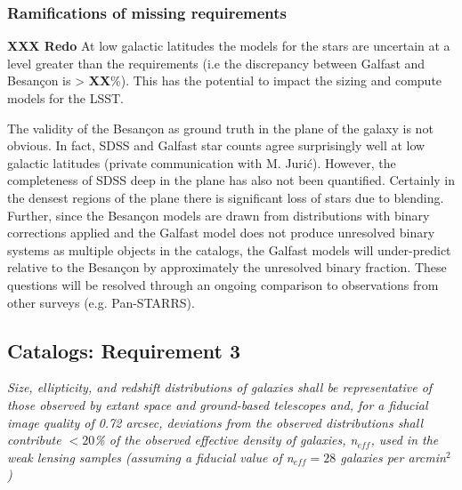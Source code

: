 \documentclass[]{article}
\begin{document}
\subsubsection{Ramifications of missing requirements}


{\bf XXX Redo}
At low galactic latitudes the models for the stars are uncertain at a
level greater than the requirements (i.e the discrepancy between
Galfast and Besan\c{c}on is > {\bf XX}\%).  This has the potential to
impact the sizing and compute models for the LSST.

The validity of the Besan\c{c}on as ground truth in the plane of the
galaxy is not obvious.  In fact, SDSS and Galfast star counts agree
surprisingly well at low galactic latitudes (private communication
with M. Juri\'{c}).  However, the completeness of SDSS deep in the
plane has also not been quantified.  Certainly in the densest regions
of the plane there is significant loss of stars due to blending.
Further, since the Besan\c{c}on models are drawn from distributions
with binary corrections applied and the Galfast model does not produce
unresolved binary systems as multiple objects in the catalogs, the
Galfast models will under-predict relative to the Besan\c{c}on by
approximately the unresolved binary fraction.  These questions will be
resolved through an ongoing comparison to observations from other
surveys (e.g. Pan-STARRS).

\subsection{Catalogs:  Requirement 3}

{\it Size, ellipticity, and redshift distributions of galaxies shall
  be representative of those observed by extant space and ground-based
  telescopes and, for a fiducial image quality of 0.72 arcsec,
  deviations from the observed distributions shall contribute $<20$\%
  of the observed effective density of galaxies, n$_{eff}$, used in
  the weak lensing samples (assuming a fiducial value of n$_{eff} =
  28$ galaxies per arcmin$^2$)}\\
\end{document}
